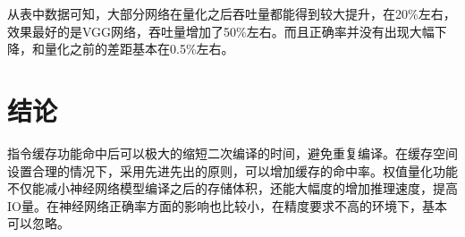 从表中数据可知，大部分网络在量化之后吞吐量都能得到较大提升，在20\%左右，效果最好的是VGG网络，吞吐量增加了50\%左右。而且正确率并没有出现大幅下降，和量化之前的差距基本在0.5\%左右。

\section {结论}
指令缓存功能命中后可以极大的缩短二次编译的时间，避免重复编译。在缓存空间设置合理的情况下，采用先进先出的原则，可以增加缓存的命中率。权值量化功能不仅能减小神经网络模型编译之后的存储体积，还能大幅度的增加推理速度，提高IO量。在神经网络正确率方面的影响也比较小，在精度要求不高的环境下，基本可以忽略。



